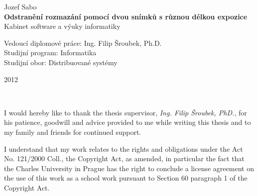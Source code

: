 \documentclass[12pt,notitlepage]{report}
\begin{document}
\begin{titlepage}
\begin{center}
\vspace{15mm}

{\Large Jozef Sabo}\\ %
\vspace{5mm}
{\Large\bf Odstranění rozmazání pomocí dvou snímků s různou délkou expozice}\\
\vspace{5mm}
Kabinet software a výuky informatiky\\ %
\end{center}
\vspace{17mm}

\begin{center}
\large
\noindent Vedoucí diplomové práce: Ing. Filip Šroubek, Ph.D. \\
\vspace{1mm}
\noindent Studijní program: Informatika \\
\vspace{1mm}
\noindent Studijní obor: Distribuované systémy \\
\end{center}

\vspace{8mm}


\begin{center}
2012 %
\end{center}

\end{titlepage} %
\pagestyle{plain}
\normalsize %
\setcounter{page}{2} %
\ \vspace{10mm}

\noindent I would hereby like to thank the thesis supervisor, {\em Ing. Filip Šroubek, PhD.}, for his patience, goodwill and advice provided to me while writing this thesis and to my family and friends for continued support.

\vspace{\fill} %

\noindent I understand that my work relates to the rights and obligations under the Act No. 121/2000 Coll., the Copyright Act, as amended, in particular the fact that the Charles University in Prague has the right to conclude a license agreement on the use of this work as a school work pursuant to Section 60 paragraph 1 of the Copyright Act. \\
\end{document}

